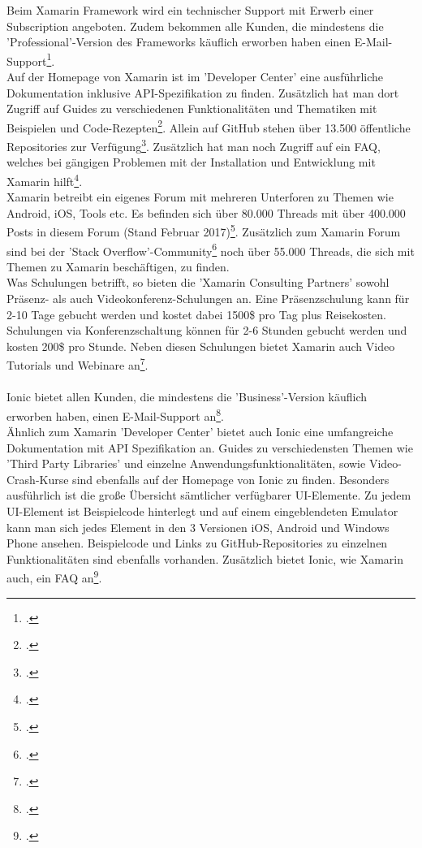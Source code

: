 Beim Xamarin Framework wird ein technischer Support mit Erwerb einer Subscription angeboten. Zudem bekommen alle Kunden, die mindestens die 'Professional'-Version des Frameworks käuflich erworben haben einen E-Mail-Support\footcite{XamarinPricing}. 
\\
Auf der Homepage von Xamarin ist im 'Developer Center' eine ausführliche Dokumentation inklusive API-Spezifikation zu finden. Zusätzlich hat man dort Zugriff auf Guides zu verschiedenen Funktionalitäten und Thematiken mit Beispielen und Code-Rezepten\footcite{XamarinHomepage}. Allein auf GitHub stehen über 13.500 öffentliche Repositories zur Verfügung\footcite{GitHubTrending}. Zusätzlich hat man noch Zugriff auf ein FAQ, welches bei gängigen Problemen mit der Installation und Entwicklung mit Xamarin hilft\footcite{XamarinHomepage}. 
\\
Xamarin betreibt ein eigenes Forum mit mehreren Unterforen zu Themen wie Android, iOS, Tools etc. Es befinden sich über 80.000 Threads mit über 400.000 Posts in diesem Forum (Stand Februar 2017)\footcite{XamarinForums}. Zusätzlich zum Xamarin Forum sind bei der 'Stack Overflow'-Community\footcite{StackOverfolw} noch über 55.000 Threads, die sich mit Themen zu Xamarin beschäftigen, zu finden. 
\\
Was Schulungen betrifft, so bieten die 'Xamarin Consulting Partners' sowohl Präsenz- als auch Videokonferenz-Schulungen an. Eine Präsenzschulung kann für 2-10 Tage gebucht werden und kostet dabei 1500\$ pro Tag plus Reisekosten. Schulungen via Konferenzschaltung können für 2-6 Stunden gebucht werden und kosten 200\$ pro Stunde. Neben diesen Schulungen bietet Xamarin auch Video Tutorials und Webinare an\footcite{XamarinHomepage}. 
\\
\\
Ionic bietet allen Kunden, die mindestens die 'Business'-Version käuflich erworben haben, einen E-Mail-Support an\footcite{IonicHomepage}. 
\\
Ähnlich zum Xamarin 'Developer Center' bietet auch Ionic eine umfangreiche Dokumentation mit API Spezifikation an. Guides zu verschiedensten Themen wie 'Third Party Libraries' und einzelne Anwendungsfunktionalitäten, sowie Video-Crash-Kurse sind ebenfalls auf der Homepage von Ionic zu finden. Besonders ausführlich ist die große Übersicht sämtlicher verfügbarer UI-Elemente. Zu jedem UI-Element ist Beispielcode hinterlegt und auf einem eingeblendeten Emulator kann man sich jedes Element in den 3 Versionen iOS, Android und Windows Phone ansehen. Beispielcode und Links zu GitHub-Repositories zu einzelnen Funktionalitäten sind ebenfalls vorhanden. Zusätzlich bietet Ionic, wie Xamarin auch, ein FAQ an\footcite{IonicHomepage}. 
